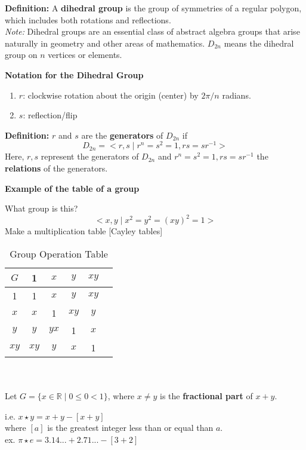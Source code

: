 \documentclass{article}
\begin{document}
{\textbf{Definition:}} A \textbf{dihedral group} is the group of symmetries of a regular polygon, which includes both rotations and reflections.\\[0.2cm]
\textit{Note:} Dihedral groups are an essential class of abstract algebra groups that arise naturally in geometry and other areas of mathematics.
\(D_{2n}\) means the dihedral group on \(n\) vertices or elements.\\[0.5cm]
\centerline{\textbf{Notation for the Dihedral Group}}
\begin{enumerate}
    \item[] \(r\): clockwise rotation about the origin (center) by \(2\pi/n \) radians.
    \item[] \(s\): reflection/flip
\end{enumerate}

\newpage
\textbf{Definition:} \(r\) and \(s\) are the \textbf{generators} of \(D_{2n}\) if
\[D_{2n}=<r,s \mid r^n=s^2=1, rs=sr^{-1}>\]
Here, \(r,s\) represent the generators of \(D_{2n}\) and \(r^n=s^2=1, rs=sr^{-1}\) the \textbf{relations} of the generators.\\[0.5cm]

\centerline{\textbf{Example of the table of a group}}
What group is this?
\[<x,y \mid x^2 = y^2 = (xy)^2 =1>\]
Make a multiplication table [Cayley tables]
\begin{table}[h]
    \centering
    \begin{tabular}{c|ccccc}
        $G$ & 1 & $x$ & $y$ & $xy$ \\
        \hline
        1 & 1 & $x$ & $y$ & $xy$ \\
        $x$ & $x$ & 1 & $xy$ & $y$ \\
        $y$ & $y$ & $yx$ & 1 & $x$ \\
        $xy$ & $xy$ & $y$ & $x$ & 1 \\
    \end{tabular}
    \caption{Group Operation Table}
    \label{tab:group_operation}
\end{table}\\

\\
Let \(G=\{x \in \mathbb{R} \mid 0 \leq 0 < 1\}\), where \(x \neq y\) is the \textbf{fractional part} of \(x+y\).
\begin{center}
    i.e. \(x \star y=x+y-[x+y]\)\\
    where \([a]\) is the greatest integer less than or equal than \(a\).\\
    ex. \(\pi \star e= 3.14...+2.71...-[3+2]\)\\[0.5cm]
\end{center}
\end{document}
